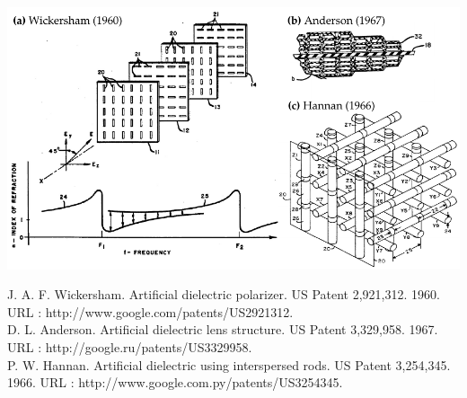 \documentclass[t]{beamer} \usepackage[english]{babel} \usepackage[utf8]{inputenc} \usetheme{Frankfurt} %
\begin{document}
\begin{frame}[plain]{\tiny{\vspace{-1em}{Early metamaterials -- artificial dielectrics}\vspace{-.5em}}} %
\includegraphics[width=\textwidth]{../img/patents/mm_patents.pdf} 

\vfill
\tiny{J. A. F. Wickersham. Artificial dielectric polarizer. US Patent 2,921,312. 1960. URL : http://www.google.com/patents/US2921312.\\
D. L. Anderson. Artificial dielectric lens structure. US Patent 3,329,958. 1967. URL : http://google.ru/patents/US3329958.\\
P. W. Hannan. Artificial dielectric using interspersed rods. US Patent 3,254,345. 1966. URL : http://www.google.com.py/patents/US3254345.}
\end{frame}%
\end{document}
